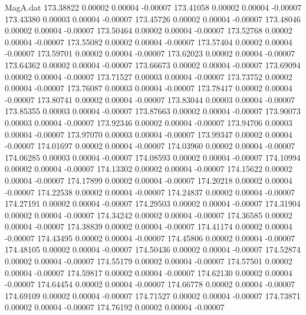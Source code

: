 \begin{filecontents}{MagA.dat}
 173.38822    0.00002    0.00004   -0.00007
 173.41058    0.00002    0.00004   -0.00007
 173.43380    0.00003    0.00004   -0.00007
 173.45726    0.00002    0.00004   -0.00007
 173.48046    0.00002    0.00004   -0.00007
 173.50464    0.00002    0.00004   -0.00007
 173.52768    0.00002    0.00004   -0.00007
 173.55082    0.00002    0.00004   -0.00007
 173.57404    0.00002    0.00004   -0.00007
 173.59701    0.00002    0.00004   -0.00007
 173.62023    0.00002    0.00004   -0.00007
 173.64362    0.00002    0.00004   -0.00007
 173.66673    0.00002    0.00004   -0.00007
 173.69094    0.00002    0.00004   -0.00007
 173.71527    0.00003    0.00004   -0.00007
 173.73752    0.00002    0.00004   -0.00007
 173.76087    0.00003    0.00004   -0.00007
 173.78417    0.00002    0.00004   -0.00007
 173.80741    0.00002    0.00004   -0.00007
 173.83044    0.00003    0.00004   -0.00007
 173.85355    0.00003    0.00004   -0.00007
 173.87663    0.00002    0.00004   -0.00007
 173.90073    0.00003    0.00004   -0.00007
 173.92346    0.00002    0.00004   -0.00007
 173.94706    0.00003    0.00004   -0.00007
 173.97070    0.00003    0.00004   -0.00007
 173.99347    0.00002    0.00004   -0.00007
 174.01697    0.00002    0.00004   -0.00007
 174.03960    0.00002    0.00004   -0.00007
 174.06285    0.00003    0.00004   -0.00007
 174.08593    0.00002    0.00004   -0.00007
 174.10994    0.00002    0.00004   -0.00007
 174.13302    0.00002    0.00004   -0.00007
 174.15622    0.00002    0.00004   -0.00007
 174.17899    0.00002    0.00004   -0.00007
 174.20218    0.00002    0.00004   -0.00007
 174.22538    0.00002    0.00004   -0.00007
 174.24837    0.00002    0.00004   -0.00007
 174.27191    0.00002    0.00004   -0.00007
 174.29503    0.00002    0.00004   -0.00007
 174.31904    0.00002    0.00004   -0.00007
 174.34242    0.00002    0.00004   -0.00007
 174.36585    0.00002    0.00004   -0.00007
 174.38839    0.00002    0.00004   -0.00007
 174.41174    0.00002    0.00004   -0.00007
 174.43495    0.00002    0.00004   -0.00007
 174.45806    0.00002    0.00004   -0.00007
 174.48105    0.00002    0.00004   -0.00007
 174.50436    0.00002    0.00004   -0.00007
 174.52874    0.00002    0.00004   -0.00007
 174.55179    0.00002    0.00004   -0.00007
 174.57501    0.00002    0.00004   -0.00007
 174.59817    0.00002    0.00004   -0.00007
 174.62130    0.00002    0.00004   -0.00007
 174.64454    0.00002    0.00004   -0.00007
 174.66778    0.00002    0.00004   -0.00007
 174.69109    0.00002    0.00004   -0.00007
 174.71527    0.00002    0.00004   -0.00007
 174.73871    0.00002    0.00004   -0.00007
 174.76192    0.00002    0.00004   -0.00007

\end{filecontents}

